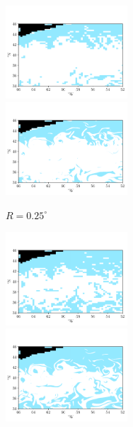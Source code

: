 \begin{figure}
	\centering
	\begin{subfigure}{\textwidth}
		\includegraphics[width=0.5\textwidth]{chp06_applications/figures/gulf_stream/S2_robust_grid_0.25}
		\includegraphics[width=0.5\textwidth]{chp06_applications/figures/gulf_stream/S2_robust_high_0.25}
		\caption{\(R = 0.25^\circ\)}
	\end{subfigure}
	\begin{subfigure}{\textwidth}
		\includegraphics[width=0.5\textwidth]{chp06_applications/figures/gulf_stream/S2_robust_grid_0.5}
		\includegraphics[width=0.5\textwidth]{chp06_applications/figures/gulf_stream/S2_robust_high_0.5}

\end{subfigure}
\end{figure}
